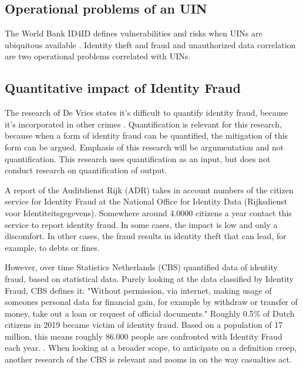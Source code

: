 \subsection{Operational problems of an UIN}
The World Bank ID4ID defines vulnerabilities and risks when UINs are ubiquitous available \cite{WorldBank_protecting}. Identity theft and fraud and unauthorized data correlation are two operational problems correlated with UINs. 

\subsection{Quantitative impact of Identity Fraud}
The research of De Vries \etal states it's difficult to quantify identity fraud, because it's incorporated in other crimes {\cite{Vries2007IdentiteitsfraudeEA}}{}. Quantification is relevant for this research, because when a form of identity fraud can be quantified, the mitigation of this form can be argued. Emphasis of this research will be argumentation and not quantification. This research uses quantification as an input, but does not conduct research on quantification of output. {}

A report of the Auditdienst Rijk (ADR)\cite{ADR} takes in account numbers of the citizen service for Identity Fraud at the National Office for Identity Data (Rijksdienst voor Identiteitsgegevens). Somewhere around 4.0000 citizens a year contact this service to report identity fraud. In some cases, the impact is low and only a discomfort. In other cases, the fraud results in identity theft that can lead, for example, to debts or fines.\par

However, over time Statistics Netherlands (CBS) quantified data of identity fraud, based on statistical data. Purely looking at the data classified by Identity Fraud, CBS defines it: "Without permission, via internet, making usage of someones personal data for financial gain, for example by withdraw or transfer of money, take out a loan or request of official documents." Roughly 0.5\% of Dutch citizens in 2019 became victim of identity fraud. Based on a population of 17 million, this means roughly 86.000 people are confronted with Identity Fraud each year. 
{}.
When looking at a broader scope, to anticipate on a definition creep, another research of the CBS is relevant {\cite{CBS_casualtiesDigitalCrime}} and zooms in on the way casualties act.

